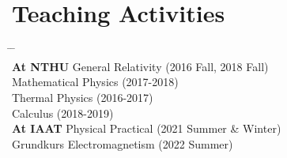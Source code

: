 \documentclass[10pt,floatfix,a4paper]{article}
\begin{document}
\section*{Teaching Activities}
\begin{tabbing}
  \hspace*{10mm} \= \hspace*{2.3cm} \= \hspace*{10cm} \\[-3ex]
  \> \textbf{At NTHU} \> General Relativity (2016 Fall, 2018 Fall)\\
  \> \> Mathematical Physics (2017-2018) \\
  \> \> Thermal Physics (2016-2017) \\
  \> \> Calculus (2018-2019) \\
  \> \textbf{At IAAT} \> Physical Practical (2021 Summer \& Winter)\\
  \> \> Grundkurs Electromagnetism (2022 Summer)
\end{tabbing}



\iffalse
\end{document}

